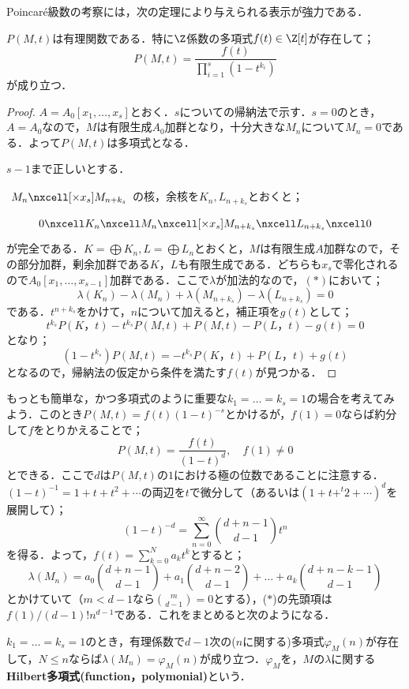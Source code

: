 Poincar\'e級数の考察には，次の定理により与えられる表示が強力である．

\begin{thm}
	$P(M,t)$は有理関数である．特に$\Z$係数の多項式$f(t)\in\Z[t]$が存在して；
	\[P(M,t)=\frac{f(t)}{\prod_{i=1}^s(1-t^{k_i})}\]
	が成り立つ．
\end{thm}

\begin{proof}
	$A=A_0[x_1,\dots,x_s]$とおく．$s$についての帰納法で示す．$s=0$のとき，$A=A_0$なので，$M$は有限生成$A_0$加群となり，十分大きな$M_n$について$M_n=0$である．よって$P(M,t)$は多項式となる．
		
	$s-1$まで正しいとする．
	
	$\begin{tikzcd}
		M_n\nxcell[\times x_s]M_{n+k_s}
	\end{tikzcd}$の核，余核を$K_n,L_{n+k_s}$とおくと；
	\[\begin{tikzcd}
		0\nxcell K_n\nxcell M_n\nxcell[\times x_s]M_{n+k_s}\nxcell L_{n+k_s}\nxcell0
	\end{tikzcd}\]
	が完全である．$K=\bigoplus K_n,L=\bigoplus L_n$とおくと，$M$は有限生成$A$加群なので，その部分加群，剰余加群である$K，L$も有限生成である．どちらも$x_s$で零化されるので$A_0[x_1,\dots,x_{s-1}]$加群である．ここで$\lambda$が加法的なので，$(\ast)$において；
	\[\lambda(K_n)-\lambda(M_n)+\lambda(M_{n+k_s})-\lambda(L_{n+k_s})=0\]
	である．$t^{n+k_s}$をかけて，$n$について加えると，補正項を$g(t)$として；
	\[t^{k_s}P(K，t)-t^{k_s}P(M,t)+P(M,t)-P(L，t)-g(t)=0\]
	となり；
	\[(1-t^{k_s})P(M,t)=-t^{k_s}P(K，t)+P(L，t)+g(t)\]
	となるので，帰納法の仮定から条件を満たす$f(t)$が見つかる．
\end{proof}

もっとも簡単な，かつ多項式のように重要な$k_1=\dots=k_s=1$の場合を考えてみよう．このとき$P(M,t)=f(t)(1-t)^{-s}$とかけるが，$f(1)=0$ならば約分して$f$をとりかえることで；
\[P(M,t)=\frac{f(t)}{(1-t)^d},\quad f(1)\neq0\]
とできる．ここで$d$は$P(M,t)$の$1$における極の位数であることに注意する．$(1-t)^{-1}=1+t+t^2+\cdots$の両辺を$t$で微分して（あるいは$(1+t+^t2+\cdots)^{d}$を展開して）；
\[(1-t)^{-d}=\sum_{n=0}^\infty\binom{d+n-1}{d-1} t^n\]
を得る．よって，$f(t)=\sum_{k=0}^N a_kt^k$とすると；
\[\lambda(M_n)=a_0\binom{d+n-1}{d-1}+a_1\binom{d+n-2}{d-1}+\dots+a_k\binom{d+n-k-1}{d-1}\tag{$\ast$}\]
とかけていて（$m<d-1$なら$\binom{m}{d-1}=0$とする），($\ast$)の先頭項は$f(1)/(d-1)! n^{d-1}$である．これをまとめると次のようになる．

\begin{defi}[Hilbert多項式]\label{defi:Hilbert多項式}
	$k_1=\dots=k_s=1$のとき，有理係数で$d-1$次の($n$に関する)多項式$\varphi_M(n)$が存在して，$N
	\leq n$ならば$\lambda(M_n)=\varphi_M(n)$が成り立つ．$\varphi_M$を，$M$の$\lambda$に関する\textbf{Hilbert多項式(function，polymonial)}という．
\end{defi}

